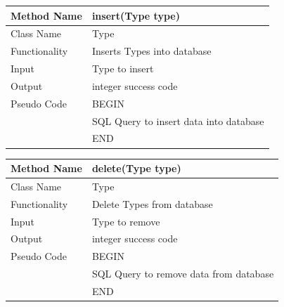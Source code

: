 \documentclass[12pt]{article}
\begin{document}
\begin{tabular}{ |p{3cm}||p{\colWidth}|  }
	\hline
	Method Name &  insert(Type type)\\
	\hline
	Class Name & Type\\
	\hline
	Functionality & Inserts Types into database\\
	\hline
	Input & Type to insert\\
	\hline
	Output & integer success code\\
	\hline
	Pseudo Code&BEGIN\\ & SQL Query to insert data into database\\&END\\
	\hline
\end{tabular}    

\begin{tabular}{ |p{3cm}||p{\colWidth}|  }
	\hline
	Method Name &  delete(Type type)\\
	\hline
	Class Name & Type\\
	\hline
	Functionality & Delete Types from database\\
	\hline
	Input & Type to remove\\
	\hline
	Output & integer success code\\
	\hline
	Pseudo Code&BEGIN\\ & SQL Query to remove data from database\\&END\\
	\hline
\end{tabular}  
\end{document}
